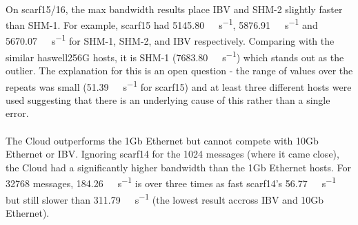 \documentclass{article}
\begin{document}
            \paragraph{}
            On scarf15/16, the max bandwidth results place IBV and SHM-2 slightly faster than SHM-1. For example, scarf15 had \SI{5145.80}{\mega\byte\per\second}, \SI{5876.91}{\mega\byte\per\second} and \SI{5670.07}{\mega\byte\per\second} for SHM-1, SHM-2, and IBV respectively. Comparing with the similar haswell256G hosts, it is SHM-1 (\SI{7683.80}{\mega\byte\per\second}) which stands out as the outlier. The explanation for this is an open question - the range of values over the repeats was small (\SI{51.39}{\mega\byte\per\second} for scarf15) and at least three different hosts were used suggesting that there is an underlying cause of this rather than a single error.

            \paragraph{}
            The Cloud outperforms the 1Gb Ethernet but cannot compete with 10Gb Ethernet or IBV. Ignoring scarf14 for the \SI{1024}{\byte} messages (where it came close), the Cloud had a significantly higher bandwidth than the 1Gb Ethernet hosts. For \SI{32768}{\byte} messages, \SI{184.26}{\mega\byte\per\second} is over three times as fast scarf14's \SI{56.77}{\mega\byte\per\second} but still slower than \SI{311.79}{\mega\byte\per\second} (the lowest result accross IBV and 10Gb Ethernet).
\end{document}
